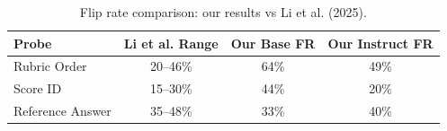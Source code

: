 \begin{table}[h]
\centering\small
\caption{Flip rate comparison: our results vs Li et al. (2025).}
\label{tab:compare}
\begin{tabular}{lccc}
\toprule
Probe & Li et al. Range & Our Base FR & Our Instruct FR \\
\midrule
Rubric Order & 20--46\% & 64\% & 49\% \\
Score ID & 15--30\% & 44\% & 20\% \\
Reference Answer & 35--48\% & 33\% & 40\% \\
\bottomrule
\end{tabular}
\end{table}